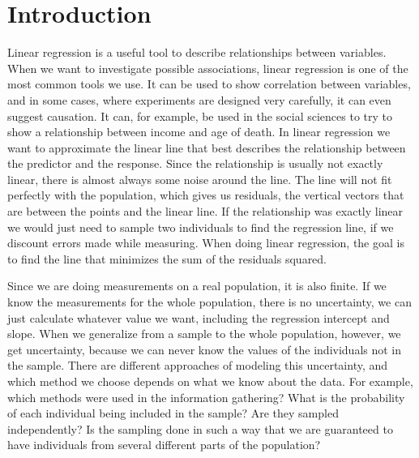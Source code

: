 \documentclass{article}
\begin{document}
\newpage

\tableofcontents

\newpage

\section{Introduction}


Linear regression is a useful tool to describe relationships between variables.
When we want to investigate possible associations, linear regression
is one of the most common tools we use. It can be used to show correlation between
variables, and in some cases, where experiments are designed very carefully, it can even suggest causation.
It can, for example, be used in the social sciences to try to show a relationship
between income and age of death. In linear regression we want to approximate the
linear line that best describes the relationship between the predictor and the
response. Since the relationship is usually not exactly linear, there is almost
always some noise around the line. The line will not
fit perfectly with the population, which gives us residuals, the vertical
vectors that are between the points and the linear line. If the relationship was
exactly linear we would just need to sample two individuals to find the
regression line, if we discount errors made while measuring. When doing linear
regression, the goal is to find the line that minimizes the sum of the residuals squared.

Since we are doing measurements on a real population, it is also finite.
If we know the measurements for the whole population, there
is no uncertainty, we can just calculate whatever value we
want, including the regression intercept and slope. When we generalize from a sample to the whole population, however, we get
uncertainty, because we can never know the values of the individuals not in the sample. There are different approaches of modeling this uncertainty, and
which method we choose depends on what we know about the data. For example, which
methods were used in the information gathering?
What is the probability of each
individual being included in the sample? Are they sampled independently? Is the
sampling done in such a way that we are guaranteed to have individuals from
several different parts of the population?
\end{document}
